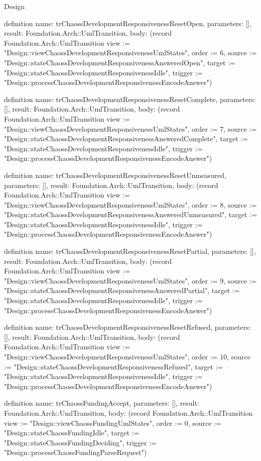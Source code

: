 \begin{lexlean}{Design}
\begin{semanticmodule}
definition{
  name: trChaossDevelopmentResponsivenessResetOpen,
  parameters: [],
  result: Foundation.Arch::UmlTransition,
  body: (record Foundation.Arch::UmlTransition {view := "Design::viewChaossDevelopmentResponsivenessUmlStates", order := 6, source := "Design::stateChaossDevelopmentResponsivenessAnsweredOpen", target := "Design::stateChaossDevelopmentResponsivenessIdle", trigger := "Design::processChaossDevelopmentResponsivenessEncodeAnswer"})
}

definition{
  name: trChaossDevelopmentResponsivenessResetComplete,
  parameters: [],
  result: Foundation.Arch::UmlTransition,
  body: (record Foundation.Arch::UmlTransition {view := "Design::viewChaossDevelopmentResponsivenessUmlStates", order := 7, source := "Design::stateChaossDevelopmentResponsivenessAnsweredComplete", target := "Design::stateChaossDevelopmentResponsivenessIdle", trigger := "Design::processChaossDevelopmentResponsivenessEncodeAnswer"})
}

definition{
  name: trChaossDevelopmentResponsivenessResetUnmeasured,
  parameters: [],
  result: Foundation.Arch::UmlTransition,
  body: (record Foundation.Arch::UmlTransition {view := "Design::viewChaossDevelopmentResponsivenessUmlStates", order := 8, source := "Design::stateChaossDevelopmentResponsivenessAnsweredUnmeasured", target := "Design::stateChaossDevelopmentResponsivenessIdle", trigger := "Design::processChaossDevelopmentResponsivenessEncodeAnswer"})
}

definition{
  name: trChaossDevelopmentResponsivenessResetPartial,
  parameters: [],
  result: Foundation.Arch::UmlTransition,
  body: (record Foundation.Arch::UmlTransition {view := "Design::viewChaossDevelopmentResponsivenessUmlStates", order := 9, source := "Design::stateChaossDevelopmentResponsivenessAnsweredPartial", target := "Design::stateChaossDevelopmentResponsivenessIdle", trigger := "Design::processChaossDevelopmentResponsivenessEncodeAnswer"})
}

definition{
  name: trChaossDevelopmentResponsivenessResetRefused,
  parameters: [],
  result: Foundation.Arch::UmlTransition,
  body: (record Foundation.Arch::UmlTransition {view := "Design::viewChaossDevelopmentResponsivenessUmlStates", order := 10, source := "Design::stateChaossDevelopmentResponsivenessRefused", target := "Design::stateChaossDevelopmentResponsivenessIdle", trigger := "Design::processChaossDevelopmentResponsivenessEncodeAnswer"})
}

definition{
  name: trChaossFundingAccept,
  parameters: [],
  result: Foundation.Arch::UmlTransition,
  body: (record Foundation.Arch::UmlTransition {view := "Design::viewChaossFundingUmlStates", order := 0, source := "Design::stateChaossFundingIdle", target := "Design::stateChaossFundingDeciding", trigger := "Design::processChaossFundingParseRequest"})
}


\end{semanticmodule}
\end{lexlean}
